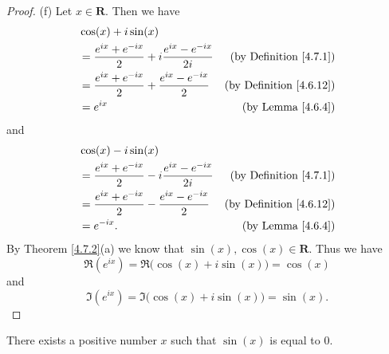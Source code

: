 \begin{proof}{(f)}
    Let \(x \in \mathbf{R}\).
    Then we have
    \begin{align*}
         & \cos(x) + i \sin(x)                                                                                      \\
         & = \frac{e^{i x} + e^{- i x}}{2} + i \frac{e^{i x} - e^{- i x}}{2i} & \text{(by Definition \ref{4.7.1})}  \\
         & = \frac{e^{i x} + e^{- i x}}{2} + \frac{e^{i x} - e^{- i x}}{2}    & \text{(by Definition \ref{4.6.12})} \\
         & = e^{i x}                                                          & \text{(by Lemma \ref{4.6.4})}
    \end{align*}
    and
    \begin{align*}
         & \cos(x) - i \sin(x)                                                                                      \\
         & = \frac{e^{i x} + e^{- i x}}{2} - i \frac{e^{i x} - e^{- i x}}{2i} & \text{(by Definition \ref{4.7.1})}  \\
         & = \frac{e^{i x} + e^{- i x}}{2} - \frac{e^{i x} - e^{- i x}}{2}    & \text{(by Definition \ref{4.6.12})} \\
         & = e^{- i x}.                                                       & \text{(by Lemma \ref{4.6.4})}
    \end{align*}
    By Theorem \ref{4.7.2}(a) we know that \(\sin(x), \cos(x) \in \mathbf{R}\).
    Thus we have
    \[
        \Re(e^{i x}) = \Re\big(\cos(x) + i \sin(x)\big) = \cos(x)
    \]
    and
    \[
        \Im(e^{i x}) = \Im\big(\cos(x) + i \sin(x)\big) = \sin(x).
    \]
\end{proof}

\begin{lemma}\label{4.7.3}
    There exists a positive number \(x\) such that \(\sin(x)\) is equal to \(0\).
\end{lemma}

